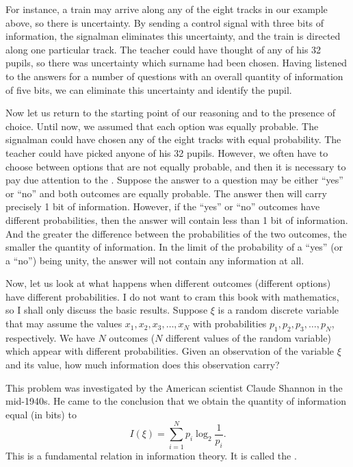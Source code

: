 For instance, a train may arrive along any of the eight tracks in our
example above, so there is uncertainty. By sending a control signal with
three bits of information, the signalman eliminates this uncertainty, and
the train is directed along one particular track. The teacher could have
thought of any of his 32 pupils, so there was uncertainty which surname
had been chosen. Having listened to the answers for a number of
questions with an overall quantity of information of five bits, we can
eliminate this uncertainty and identify the pupil.

Now let us return to the starting point of our reasoning and to the
presence of choice. Until now, we assumed that each option was equally
probable. The signalman could have chosen any of the eight tracks with
equal probability. The teacher could have picked anyone of his 32
pupils. However, we often have to choose between options that are not
equally probable, and then it is necessary to pay due attention to the
. Suppose the answer to a question may be either ``yes'' or ``no'' and both outcomes are equally probable.
The answer then will carry precisely 1 bit of information. However, if
the ``yes'' or ``no'' outcomes have different probabilities, then the answer
will contain less than 1 bit of information. And the greater the difference
between the probabilities of the two outcomes, the smaller the quantity
of information. In the limit of the probability of a ``yes'' (or a ``no'')
being unity, the answer will not contain any information at all.

Now, let us look at what happens when different outcomes (different
options) have different probabilities. I do not want to cram this book
with mathematics, so I shall only discuss the basic results. Suppose $\xi$ is
a random discrete variable that may assume the values $x_{1}, x_{2}, x_{3},\ldots{} , x_{N}$ with probabilities  $p_{1}, p_{2}, p_{3},\ldots{} , p_{N}$, respectively. We have $N$ outcomes ($N$ different values of the random variable) which appear with different probabilities. Given an observation of the variable $\xi$ and its value, how much information does this observation carry?

This problem was investigated by the American scientist Claude
Shannon in the mid-1940s. He came to the conclusion that we obtain
the quantity of information equal (in bits) to
\begin{equation}%
I(\xi) = \sum_{i=1}^{N} p_{i}  \log_{2} \frac{1}{p_{i}}.
\label{eq-3.2}
\end{equation}
This is a fundamental relation in information theory. It is called the
.

